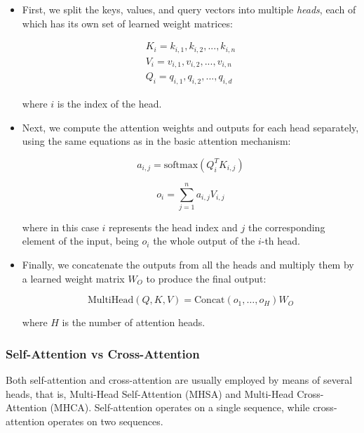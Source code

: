 \begin{itemize}
	\item First, we split the keys, values, and query vectors into multiple \textit{heads}, each of which has its own set of learned weight matrices:
	
	\begin{equation}
		\begin{split}
			K_i = {k_{i,1}, k_{i,2}, ..., k_{i,n}} \\
			V_i = {v_{i,1}, v_{i,2}, ..., v_{i,n}} \\
			Q_i = {q_{i,1}, q_{i,2}, ..., q_{i,d}}
		\end{split}
	\end{equation}
	
	where $i$ is the index of the head. 
	
	\item Next, we compute the attention weights and outputs for each head separately, using the same equations as in the basic attention mechanism:
	
	\begin{equation}
		a_{i,j} = \text{softmax}(Q_i^T K_{i,j})
	\end{equation}
	
	\begin{equation}
		o_{i} = \sum_{j=1}^{n} a_{i,j} V_{i,j}
	\end{equation}

	where in this case $i$ represents the head index and $j$ the corresponding element of the input, being $o_{i}$ the whole output of the $i$-th head.
	
	\item Finally, we concatenate the outputs from all the heads and multiply them by a learned weight matrix $W_{O}$ to produce the final output:
	
	\begin{equation}
		\text{MultiHead}(Q, K, V) = \text{Concat}(o_{1}, \dots, o_{H})W_{O}
	\end{equation}
	
	where $H$ is the number of attention heads.
\end{itemize}

\subsubsection{Self-Attention vs Cross-Attention}
\label{subsubsec:3_self_attention_vs_cross_attention}

Both self-attention and cross-attention are usually employed by means of several heads, that is, Multi-Head Self-Attention (MHSA) and Multi-Head Cross-Attention (MHCA). Self-attention operates on a single sequence, while cross-attention operates on two sequences. 

